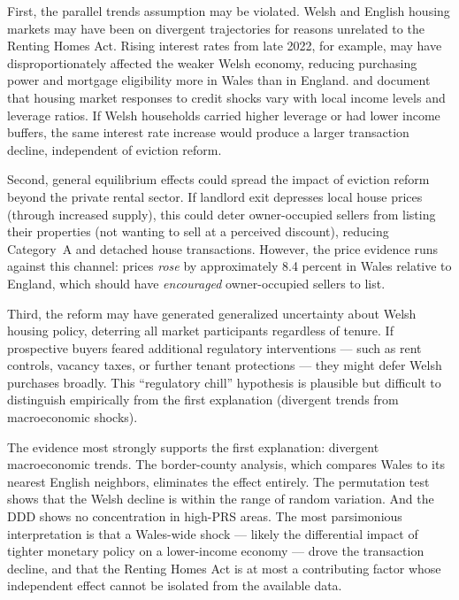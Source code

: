 \documentclass[12pt]{article}
\begin{document}
First, the parallel trends assumption may be violated. Welsh and English housing markets may have been on divergent trajectories for reasons unrelated to the Renting Homes Act. Rising interest rates from late 2022, for example, may have disproportionately affected the weaker Welsh economy, reducing purchasing power and mortgage eligibility more in Wales than in England. \citet{mian2013household} and \citet{mian2014house} document that housing market responses to credit shocks vary with local income levels and leverage ratios. If Welsh households carried higher leverage or had lower income buffers, the same interest rate increase would produce a larger transaction decline, independent of eviction reform.

Second, general equilibrium effects could spread the impact of eviction reform beyond the private rental sector. If landlord exit depresses local house prices (through increased supply), this could deter owner-occupied sellers from listing their properties (not wanting to sell at a perceived discount), reducing Category~A and detached house transactions. However, the price evidence runs against this channel: prices \textit{rose} by approximately 8.4 percent in Wales relative to England, which should have \textit{encouraged} owner-occupied sellers to list.

Third, the reform may have generated generalized uncertainty about Welsh housing policy, deterring all market participants regardless of tenure. If prospective buyers feared additional regulatory interventions --- such as rent controls, vacancy taxes, or further tenant protections --- they might defer Welsh purchases broadly. This ``regulatory chill'' hypothesis is plausible but difficult to distinguish empirically from the first explanation (divergent trends from macroeconomic shocks).

The evidence most strongly supports the first explanation: divergent macroeconomic trends. The border-county analysis, which compares Wales to its nearest English neighbors, eliminates the effect entirely. The permutation test shows that the Welsh decline is within the range of random variation. And the DDD shows no concentration in high-PRS areas. The most parsimonious interpretation is that a Wales-wide shock --- likely the differential impact of tighter monetary policy on a lower-income economy --- drove the transaction decline, and that the Renting Homes Act is at most a contributing factor whose independent effect cannot be isolated from the available data.
\end{document}
